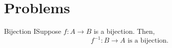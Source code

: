 \newpage

        \section{Problems}


            \begin{exercise}
                {Bijection I}Suppose \(f\colon A \rightarrow B\) is a  bijection. Then, \[f^{-1} \colon B \rightarrow A \text{ is a bijection.}\]
            \end{exercise}

